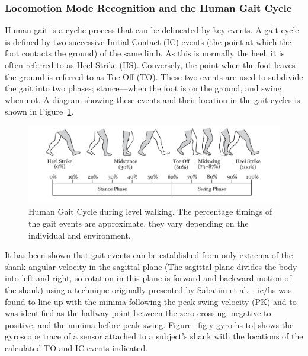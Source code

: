 \subsubsection{Locomotion Mode Recognition and the Human Gait Cycle}

Human gait is a cyclic process that can be delineated by key events. A gait cycle is defined by two successive Initial Contact (IC) events (the point at which the foot contacts the ground) of the same limb. As this is normally the heel, it is often referred to as Heel Strike (HS). Conversely, the point when the foot leaves the ground is referred to as Toe Off (TO). These two events are used to subdivide the gait into two phases; stance---when the foot is on the ground, and swing when not. A diagram showing these events and their location in the gait cycles is shown in Figure~\ref{fig:gait_cycle}.

\begin{figure}[!hbt]
    \centering
    \includegraphics[width=\textwidth]{content/4-LSTM_Behaviour/Gait_Cycle.pdf}
    \caption[Human Gait Cycle during level walking.]{Human Gait Cycle during level walking. The percentage timings of the gait events are approximate, they vary depending on the individual and environment.}
    \label{fig:gait_cycle}
\end{figure}

It has been shown that gait events can be established from only extrema of the shank angular velocity in the sagittal plane (The sagittal plane divides the body into left and right, so rotation in this plane is forward and backward motion of the shank) using a technique originally presented by Sabatini et al.~\cite{Sabatini2005}. \acrshort{ic}/\acrshort{hs} was found to line up with the minima following the peak swing velocity (PK) and \acrshort{to} was identified as the halfway point between the zero-crossing, negative to positive, and the minima before peak swing. Figure~\ref{fig:y-gyro-hs-to} shows the gyroscope trace of a sensor attached to a subject's shank with the locations of the calculated TO and IC events indicated.


